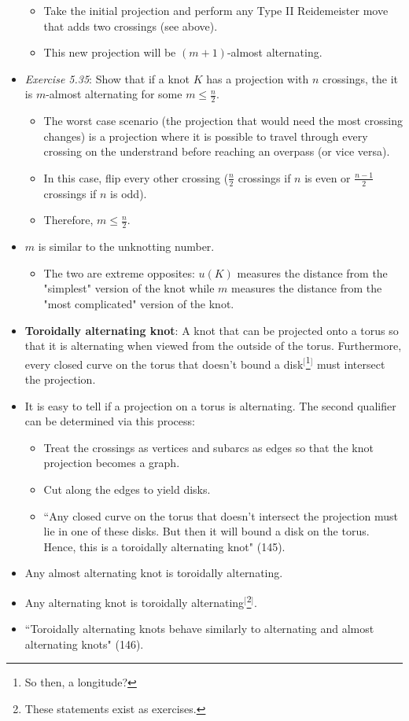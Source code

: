 \documentclass[titlepage]{article}
\numberwithin{figure}{section}
\numberwithin{table}{section}
\numberwithin{equation}{section}
\newcommand{\dq}[2]{``#1" (#2).}
\begin{document}
\begin{itemize}
    \begin{itemize}
        \item Take the initial projection and perform any Type II Reidemeister move that adds two crossings (see above).
        \item This new projection will be $(m+1)$-almost alternating.
    \end{itemize}
    \item \emph{Exercise 5.35}: Show that if a knot $K$ has a projection with $n$ crossings, the it is $m$-almost alternating for some $m\leq\frac{n}{2}$.
    \begin{itemize}
        \item The worst case scenario (the projection that would need the most crossing changes) is a projection where it is possible to travel through every crossing on the understrand before reaching an overpass (or vice versa).
        \item In this case, flip every other crossing ($\frac{n}{2}$ crossings if $n$ is even or $\frac{n-1}{2}$ crossings if $n$ is odd).
        \item Therefore, $m\leq\frac{n}{2}$.
    \end{itemize}
    \item $m$ is similar to the unknotting number.
    \begin{itemize}
        \item The two are extreme opposites: $u(K)$ measures the distance from the "simplest" version of the knot while $m$ measures the distance from the "most complicated" version of the knot.
    \end{itemize}
    \item \textbf{Toroidally alternating knot}: A knot that can be projected onto a torus so that it is alternating when viewed from the outside of the torus. Furthermore, every closed curve on the torus that doesn't bound a disk$^[$\footnote{So then, a longitude?}$^]$ must intersect the projection.
    \item It is easy to tell if a projection on a torus is alternating. The second qualifier can be determined via this process:
    \begin{itemize}
        \item Treat the crossings as vertices and subarcs as edges so that the knot projection becomes a graph.
        \item Cut along the edges to yield disks.
        \item \dq{Any closed curve on the torus that doesn't intersect the projection must lie in one of these disks. But then it will bound a disk on the torus. Hence, this is a toroidally alternating knot}{145}
    \end{itemize}
    \item Any almost alternating knot is toroidally alternating.
    \item Any alternating knot is toroidally alternating$^[$\footnote{These statements exist as exercises.}$^]$.
    \item \dq{Toroidally alternating knots behave similarly to alternating and almost alternating knots}{146}
\end{itemize}
\newpage
\end{document}
